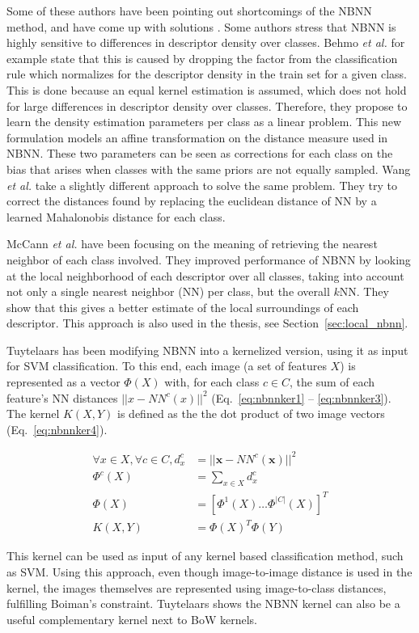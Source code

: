 Some of these authors have been pointing out shortcomings of the NBNN method, and have come up with solutions \cite{behmo2010towards, mccann2012local, timofte2012iterative, wang2011improved}. Some authors stress that NBNN is highly sensitive to differences in descriptor density over classes. Behmo \emph{et al.} \cite{behmo2010towards} for example state that this is caused by dropping the factor from the classification rule which normalizes for the descriptor density in the train set for a given class. This is done because an equal kernel estimation is assumed, which does not hold for large differences in descriptor density over classes. Therefore, they propose to learn the density estimation parameters per class as a linear problem. This new formulation models an affine transformation on the distance measure used in NBNN. These two parameters can be seen as corrections for each class on the bias that arises when classes with the same priors are not equally sampled. Wang \emph{et al.} \cite{wang2011improved} take a slightly different approach to solve the same problem. They try to correct the distances found by replacing the euclidean distance of NN by a learned Mahalonobis distance for each class.

McCann \emph{et al.} \cite{mccann2012local} have been focusing on the meaning of retrieving the nearest neighbor of each class involved. They improved performance of NBNN by looking at the local neighborhood of each descriptor over all classes, taking into account not only a single nearest neighbor (NN) per class, but the overall $k$NN. They show that this gives a better estimate of the local surroundings of each descriptor. This approach is also used in the thesis, see Section~\ref{sec:local_nbnn}.

Tuytelaars \cite{tuytelaars2011nbnn} has been modifying NBNN into a kernelized version, using it as input for SVM classification. To this end, each image (a set of features $X$) is represented as a vector $\Phi(X)$ with, for each class $c \in C$, the sum of each feature's NN distances $||x - NN^c(x)||^2$ (Eq.~\eqref{eq:nbnnker1} -- \eqref{eq:nbnnker3}). The kernel $K(X,Y)$ is defined as the the dot product of two image vectors (Eq.~\eqref{eq:nbnnker4}).

\begin{align}
    \forall x \in X, \forall c \in C, d_x^c &= ||\mathbf{x} - NN^c(\mathbf{x})||^2 \label{eq:nbnnker1}\\
    \Phi^c(X) &= \sum_{x\in X} d_x^c \label{eq:nbnnker2}\\
    \Phi(X) &= [\Phi^1(X) \ldots \Phi^{|C|}(X)]^T \label{eq:nbnnker3}\\
    K(X,Y) &= \Phi(X)^T \Phi(Y) \label{eq:nbnnker4}
\end{align}

This kernel can be used as input of any kernel based classification method, such as SVM. Using this approach, even though image-to-image distance is used in the kernel, the images themselves are represented using image-to-class distances, fulfilling Boiman's constraint. Tuytelaars shows the NBNN kernel can also be a useful complementary kernel next to BoW kernels.

